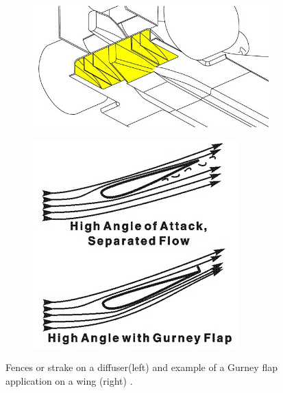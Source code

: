 \begin{figure}[!ht]
\begin{center}
%    
  \begin{subfigure}[b]{0.4\textwidth}
    \includegraphics[scale=0.6]{Figures/diffuser_fences.jpg}
  \end{subfigure}
  \begin{subfigure}[b]{0.4\textwidth}
    \includegraphics[scale=0.8]{Figures/Gurney.jpg}
  \end{subfigure}
%  
  \caption{Fences or strake on a diffuser(left) and example of a Gurney flap application on a wing (right) \cite{Anonymous2020GurneyFlap}.}
    \label{fig:gurney}
\end{center}
\end{figure}